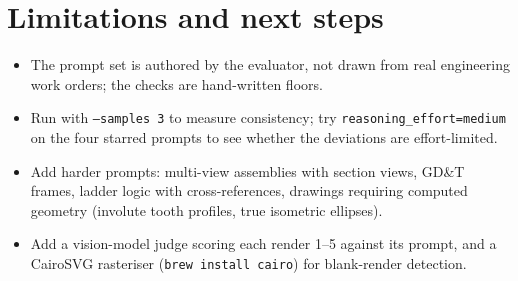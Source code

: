 \documentclass[11pt,a4paper]{article}
\begin{document}
\section{Limitations and next steps}
\begin{itemize}
  \item The prompt set is authored by the evaluator, not drawn from real engineering work orders; the checks are hand-written floors.
  \item Run with \texttt{--samples 3} to measure consistency; try \texttt{reasoning\_effort=medium} on the four starred prompts to see whether the deviations are effort-limited.
  \item Add harder prompts: multi-view assemblies with section views, GD\&T frames, ladder logic with cross-references, drawings requiring computed geometry (involute tooth profiles, true isometric ellipses).
  \item Add a vision-model judge scoring each render 1--5 against its prompt, and a CairoSVG rasteriser (\texttt{brew install cairo}) for blank-render detection.
\end{itemize}

\appendix
\end{document}
